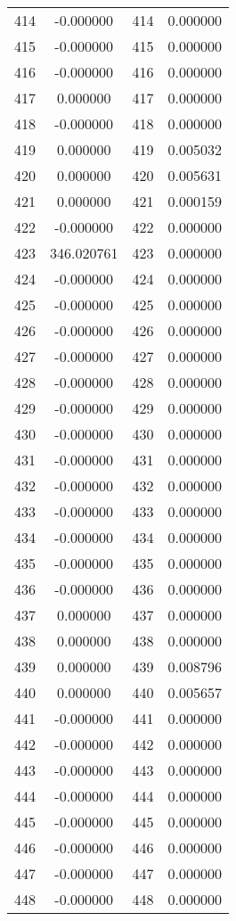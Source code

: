 \documentclass[12pt]{article}
\begin{document}
\begin{longtable}{@{}cccc@{}}
414 & -0.000000 & 414 & 0.000000 \\
415 & -0.000000 & 415 & 0.000000 \\
416 & -0.000000 & 416 & 0.000000 \\
417 & 0.000000 & 417 & 0.000000 \\
418 & -0.000000 & 418 & 0.000000 \\
419 & 0.000000 & 419 & 0.005032 \\
420 & 0.000000 & 420 & 0.005631 \\
421 & 0.000000 & 421 & 0.000159 \\
422 & -0.000000 & 422 & 0.000000 \\
423 & 346.020761 & 423 & 0.000000 \\
424 & -0.000000 & 424 & 0.000000 \\
425 & -0.000000 & 425 & 0.000000 \\
426 & -0.000000 & 426 & 0.000000 \\
427 & -0.000000 & 427 & 0.000000 \\
428 & -0.000000 & 428 & 0.000000 \\
429 & -0.000000 & 429 & 0.000000 \\
430 & -0.000000 & 430 & 0.000000 \\
431 & -0.000000 & 431 & 0.000000 \\
432 & -0.000000 & 432 & 0.000000 \\
433 & -0.000000 & 433 & 0.000000 \\
434 & -0.000000 & 434 & 0.000000 \\
435 & -0.000000 & 435 & 0.000000 \\
436 & -0.000000 & 436 & 0.000000 \\
437 & 0.000000 & 437 & 0.000000 \\
438 & 0.000000 & 438 & 0.000000 \\
439 & 0.000000 & 439 & 0.008796 \\
440 & 0.000000 & 440 & 0.005657 \\
441 & -0.000000 & 441 & 0.000000 \\
442 & -0.000000 & 442 & 0.000000 \\
443 & -0.000000 & 443 & 0.000000 \\
444 & -0.000000 & 444 & 0.000000 \\
445 & -0.000000 & 445 & 0.000000 \\
446 & -0.000000 & 446 & 0.000000 \\
447 & -0.000000 & 447 & 0.000000 \\
448 & -0.000000 & 448 & 0.000000 \\

\end{longtable}
\end{document}

